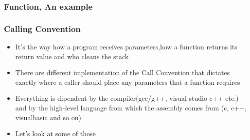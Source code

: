 \documentclass[]{beamer}
\begin{document}
		\begin{frame}
			\frametitle{Function, An example}
				\begin{figure}
				\end{figure}
		\end{frame}
		\begin{frame}
			\frametitle{Calling Convention}
			\begin{itemize}
				\item{It's the way how a program receives parameters,how a function returns its return value and who cleans the stack}
				\item{There are different implementation of the Call Convention that dictates exactly where a caller should place any parameters that a function requires}
				\item{Everything is dipendent by the compiler(gcc/g++, visual studio c++ etc.) and by the high-level language from which the assembly comes from (c, c++, visualbasic and so on) }
				\item{Let's look at some of those}
			\end{itemize}
		\end{frame}
\end{document}
